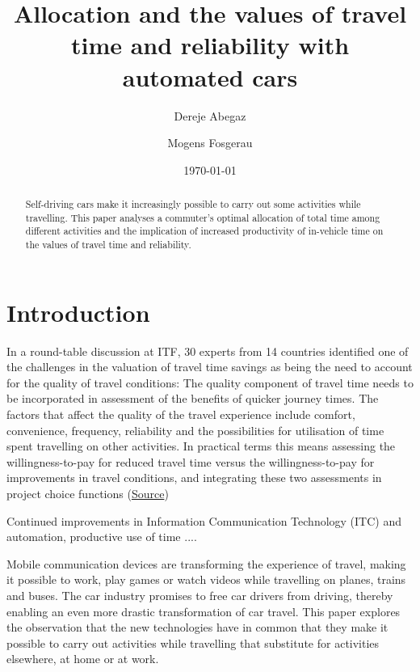 \documentclass[12pt,a4paper,british]{article}
\begin{document}
\title{Allocation and the values of travel time and reliability with automated cars}

\author{Dereje Abegaz \and Mogens Fosgerau}

\date{\today}

\maketitle

\begin{abstract}
Self-driving cars make it increasingly possible to carry out some activities while travelling. This paper analyses a commuter's optimal allocation of total time among different activities and the implication of increased productivity of in-vehicle time on the values of travel time and reliability.
\end{abstract}

\section{Introduction}
\label{sec:introduction}


In a round-table discussion at ITF, 30 experts from 14 countries identified one of the challenges in the valuation of travel time savings as being the need to account for the quality of travel conditions: The quality component of travel time needs to be incorporated in assessment of the benefits of quicker journey times. The factors that affect the quality of the travel experience include comfort, convenience, frequency, reliability and the possibilities for utilisation of time spent travelling on other activities. In practical terms this means assessing the willingness-to-pay for reduced travel time versus the willingness-to-pay for improvements in travel conditions, and integrating these two assessments in project choice functions (\href{https://www.itf-oecd.org/sites/default/files/docs/value-saving-travel-time.pdf}{Source})

Continued improvements in Information Communication Technology (ITC) and automation, productive use of time ....

Mobile communication devices are transforming the experience of travel, making it possible to work, play games or watch videos while travelling on planes, trains and buses. The car industry promises to free car drivers from driving, thereby enabling an even more drastic transformation of car travel. This paper explores the observation that the new technologies have in common that they make it possible to carry out activities while travelling that substitute for activities elsewhere, at home or at work.
\end{document}
